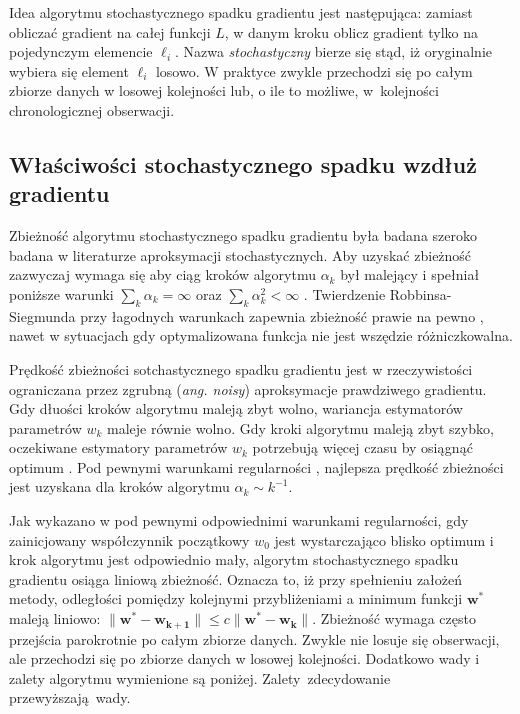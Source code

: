 Idea algorytmu stochastycznego spadku gradientu jest następująca: zamiast obliczać gradient na całej funkcji $L$, w danym kroku oblicz
gradient tylko na pojedynczym elemencie $\ell_{i}$. Nazwa \textit{stochastyczny} bierze się stąd, iż oryginalnie wybiera
się element $\ell_{i}$ losowo. W praktyce zwykle przechodzi się po całym zbiorze danych w losowej kolejności lub, o ile to możliwe, w~kolejności chronologicznej obserwacji.



\subsection{Właściwości stochastycznego spadku wzdłuż gradientu}

Zbieżność algorytmu stochastycznego spadku gradientu była badana szeroko badana w literaturze aproksymacji stochastycznych. Aby uzyskać zbieżność zazwyczaj wymaga się aby ciąg kroków algorytmu $\alpha_k$ był malejący i spełniał poniższe warunki $\sum\nolimits_k \alpha_k = \infty$ oraz $\sum\nolimits_k \alpha_k^2 < \infty$ \cite{bott1}.
Twierdzenie Robbinsa-Siegmunda \cite{robbins} przy łagodnych warunkach zapewnia zbieżność prawie na pewno \cite{bottDOD}, nawet w sytuacjach gdy optymalizowana funkcja nie jest wszędzie różniczkowalna.

Prędkość zbieżności sotchastycznego spadku gradientu jest w rzeczywistości ograniczana przez zgrubną (\textit{ang. noisy}) aproksymacje prawdziwego gradientu. Gdy dłuości kroków algorytmu
maleją zbyt wolno, wariancja estymatorów parametrów $w_k$ maleje równie wolno. Gdy kroki algorytmu maleją
zbyt szybko, oczekiwane estymatory parametrów $w_k$ potrzebują więcej czasu by osiągnąć optimum \cite{bott1}. Pod pewnymi warunkami regularności \cite{murata}, najlepsza prędkość zbieżności jest uzyskana dla kroków algorytmu $\alpha_k\sim k^{-1}$.

Jak wykazano w \cite{dennis} pod pewnymi odpowiednimi warunkami regularności, gdy zainicjowany współczynnik początkowy $w_0$ jest wystarczająco blisko optimum i krok algorytmu jest odpowiednio mały, algorytm stochastycznego spadku gradientu osiąga liniową zbieżność. Oznacza to, iż przy spełnieniu założeń metody, odległości pomiędzy kolejnymi przybliżeniami a minimum funkcji $\mathbf{w^{\ast}}$ maleją liniowo: $\parallel \mathbf{w^{\ast}} - \mathbf{w_{k+1}} \parallel \leqslant c \parallel \mathbf{w^{\ast}} - \mathbf{w_k} \parallel$. Zbieżność wymaga często przejścia parokrotnie po całym
zbiorze danych. Zwykle nie losuje się obserwacji, ale przechodzi się po zbiorze
danych w losowej kolejności. Dodatkowo wady i zalety algorytmu wymienione są poniżej. Zalety~zdecydowanie przewyższają~wady.

